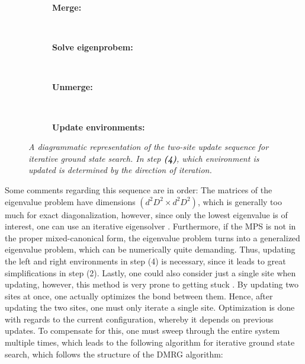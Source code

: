 \renewcommand{\thesubfigure}{\arabic{subfigure}}
\begin{figure}[h!]
	\centering
	\begin{subfigure}{\textwidth}
		\centering
		\caption{\textbf{Merge:}}
		
	\end{subfigure}\\[.25cm]
	
	\begin{subfigure}{\textwidth}
		\centering
		\caption{\textbf{Solve eigenprobem:}}
		
	\end{subfigure}\\[.25cm]

	\begin{subfigure}{\textwidth}
		\centering
		\caption{\textbf{Unmerge:}}
		
	\end{subfigure}\\[.25cm]

	\begin{subfigure}{\textwidth}
		\centering
		\caption{\textbf{Update environments:}}
		
	\end{subfigure}
	
	
	\caption{\textit{A diagrammatic representation of the two-site update sequence for iterative ground state search. In step \textbf{(4)}, which environment is updated is determined by the direction of iteration.}}
	\label{fig:twoSiteUpdate}
\end{figure}

Some comments regarding this sequence are in order: The matrices of the eigenvalue problem have dimensions $( d^2 D^2 \times d^2 D^2)$, which is generally too much for exact diagonalization, however, since only the lowest eigenvalue is of interest, one can use an iterative eigensolver \cite{Lanczos}. Furthermore, if the MPS is not in the proper mixed-canonical form, the eigenvalue problem turns into a generalized eigenvalue problem, which can be numerically quite demanding. Thus, updating the left and right environments in step (4) is necessary, since it leads to great simplifications in step (2). Lastly, one could also consider just a single site when updating, however, this method is very prone to getting stuck \cite{White2005}. By updating two sites at once, one actually optimizes the bond between them. Hence, after updating the two sites, one must only iterate a single site. Optimization is done with regards to the current configuration, whereby it depends on previous updates. To compensate for this, one must sweep through the entire system multiple times, which leads to the following algorithm for iterative ground state search, which follows the structure of the DMRG algorithm:

